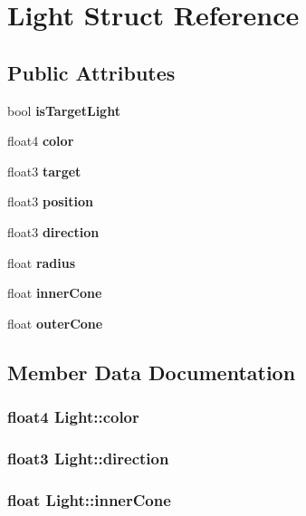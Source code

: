 \section{Light Struct Reference}
\label{struct_light}
\subsection*{Public Attributes}
\begin{DoxyCompactItemize}
\item 
bool {\bf isTargetLight}
\item 
float4 {\bf color}
\item 
float3 {\bf target}
\item 
float3 {\bf position}
\item 
float3 {\bf direction}
\item 
float {\bf radius}
\item 
float {\bf innerCone}
\item 
float {\bf outerCone}
\end{DoxyCompactItemize}


\subsection{Member Data Documentation}
\subsubsection[{color}]{\setlength{\rightskip}{0pt plus 5cm}float4 {\bf Light::color}}\label{struct_light_afa605d539d182671f9627286569c130e}
\subsubsection[{direction}]{\setlength{\rightskip}{0pt plus 5cm}float3 {\bf Light::direction}}\label{struct_light_a786f707f208776ebd9862518452f3a42}
\subsubsection[{innerCone}]{\setlength{\rightskip}{0pt plus 5cm}float {\bf Light::innerCone}}\label{struct_light_ab1d047732c60a9833ee0b21c08234d0a}

